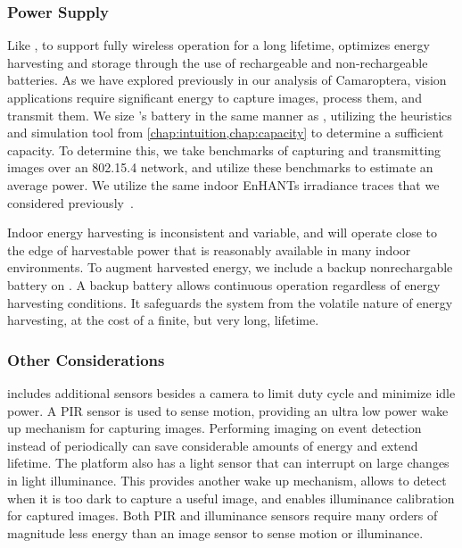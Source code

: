 \subsubsection{Power Supply}
Like \name, to support fully wireless operation for a long lifetime, \namec optimizes energy harvesting and storage through the use of rechargeable and non-rechargeable batteries.
As we have explored previously in our analysis of Camaroptera, vision applications require significant energy to capture images, process them, and transmit them. 
We size \namec's battery in the same manner as \name, utilizing the heuristics and simulation tool from \cref{chap:intuition,chap:capacity} to determine a sufficient capacity.
To determine this, we take benchmarks of capturing and transmitting images over an 802.15.4 network, and utilize these benchmarks to estimate an average power.
We utilize the same indoor EnHANTs irradiance traces that we considered previously~\cite{gorlatova2013networking}.

Indoor energy harvesting is inconsistent and variable, and \namec will operate close to the edge of harvestable power that is reasonably available in many indoor environments.
To augment harvested energy, we include a backup nonrechargable battery on \namec. A backup battery allows continuous operation regardless of energy harvesting conditions. 
It safeguards the system from the volatile nature of energy harvesting, at the cost of a finite, but very long, lifetime.

\subsubsection{Other Considerations}
\namec includes additional sensors besides a camera to limit duty cycle and minimize idle power. A PIR sensor is used to sense motion, providing an ultra low power wake up mechanism for capturing images. Performing imaging on event detection instead of periodically can save considerable amounts of energy and extend lifetime. The platform also has a light sensor that can interrupt on large changes in light illuminance. This provides another wake up mechanism, allows \namec to detect when it is too dark to capture a useful image, and enables illuminance calibration for captured images. Both PIR and illuminance sensors require many orders of magnitude less energy than an image sensor to sense motion or illuminance.

